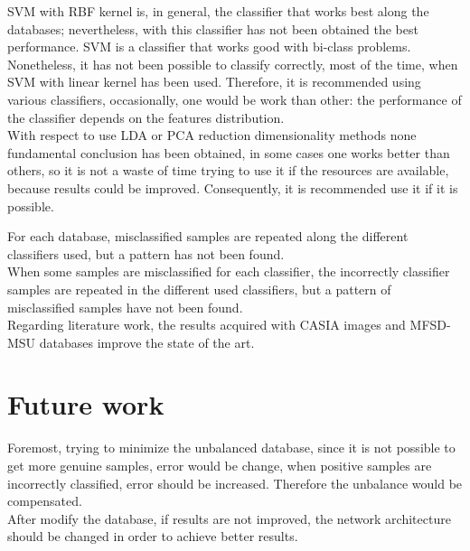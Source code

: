 SVM with RBF kernel is, in general, the classifier that works best along the databases; nevertheless, with this classifier has not been obtained the best performance. SVM is a classifier that works good with bi-class problems. Nonetheless, it has not been possible to classify correctly, most of the time, when SVM with linear kernel has been used. Therefore, it is recommended using various classifiers, occasionally, one would be work than other: the performance of the classifier depends on the features distribution.\\

With respect to use LDA or PCA reduction dimensionality methods none fundamental conclusion has been obtained, in some cases one works better than others, so it is not a waste of time trying to use it if the resources are available, because results could be improved. Consequently, it is recommended use it if it is possible.

For each database, misclassified samples are repeated along the different classifiers used, but a pattern has not been found.\\

When some samples are misclassified for each classifier, the incorrectly classifier samples are repeated in the different used classifiers, but a pattern of misclassified samples have not been found.\\

Regarding literature work, the results acquired with CASIA images and MFSD-MSU databases improve the state of the art.

\section{Future work}
Foremost, trying to minimize the unbalanced database, since it is not possible to get more genuine samples, error would be change, when positive samples are incorrectly classified, error should be increased. Therefore the unbalance would be compensated.\\

After modify the database, if results are not improved, the network architecture should be changed in order to achieve better results.\\

